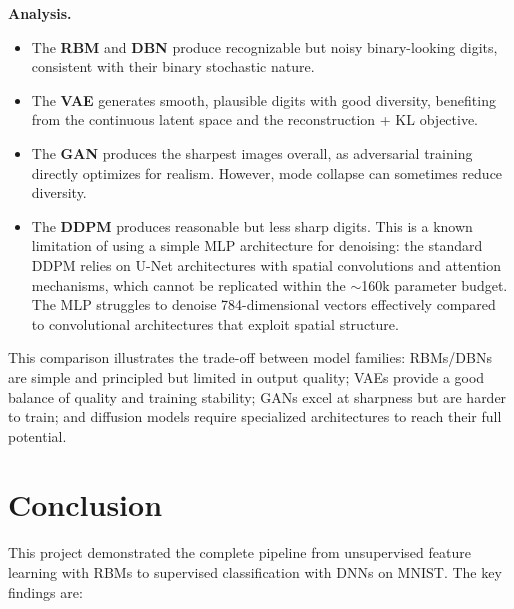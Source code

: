 \documentclass[11pt,a4paper]{article}
\begin{document}
\textbf{Analysis.}
\begin{itemize}
    \item The \textbf{RBM} and \textbf{DBN} produce recognizable but noisy binary-looking digits, consistent with their binary stochastic nature.
    \item The \textbf{VAE} generates smooth, plausible digits with good diversity, benefiting from the continuous latent space and the reconstruction + KL objective.
    \item The \textbf{GAN} produces the sharpest images overall, as adversarial training directly optimizes for realism. However, mode collapse can sometimes reduce diversity.
    \item The \textbf{DDPM} produces reasonable but less sharp digits. This is a known limitation of using a simple MLP architecture for denoising: the standard DDPM relies on U-Net architectures with spatial convolutions and attention mechanisms, which cannot be replicated within the $\sim$160k parameter budget. The MLP struggles to denoise 784-dimensional vectors effectively compared to convolutional architectures that exploit spatial structure.
\end{itemize}

This comparison illustrates the trade-off between model families: RBMs/DBNs are simple and principled but limited in output quality; VAEs provide a good balance of quality and training stability; GANs excel at sharpness but are harder to train; and diffusion models require specialized architectures to reach their full potential.

\section{Conclusion}

This project demonstrated the complete pipeline from unsupervised feature learning with RBMs to supervised classification with DNNs on MNIST. The key findings are:
\end{document}
